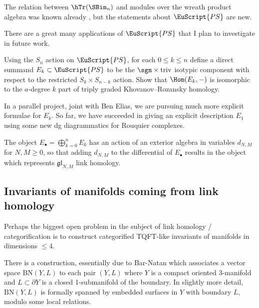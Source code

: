 \documentclass[11pt]{amsart}
\newcommand{\triv}{\mathrm{triv}}
\newcommand{\ZU}{\EuScript{PS}}
\newcommand{\gl}{\mathfrak{gl}}
\begin{document}
\begin{remark}
The relation between $\hTr(\SBim_n)$ and modules over the wreath product algebra was known already \cite{HoLiformality,HRWtrace}, but the statements about $\ZU$ are new.
\end{remark}

There are a great many applications of $\ZU$ that I plan to investigate in future work.

\begin{problem}
Using the $S_n$ action on $\ZU$, for each $0\leq k\leq n$ define a direct summand $E_k\subset \ZU$ to be the $\sgn\times \triv$ isotypic component with respect to the restricted $S_k\times S_{n-k}$ action.  Show that $\Hom(E_k,-)$ is isomorphic to the $a$-degree $k$ part of triply graded Khovanov--Rozansky homology.
\end{problem}

\begin{remark}
In a parallel project, joint with Ben Elias, we are pursuing much more explicit formulae for $E_{k}$.  So far, we have succeeded in giving an explicit description $E_{1}$ using some new dg diagrammatics for Rouquier complexes.
\end{remark}

\begin{conjecture}
The object $E_\bullet=\bigoplus_{k=0}^n E_k$ has an action of an exterior algebra in variables $d_{N,M}$ for $N,M\geq 0$, so that adding $d_{N,M}$ to the differential of  $E_\bullet$ results in the object which represents $\gl_{N,M}$ link homology.
\end{conjecture}
\subsection{Invariants of manifolds coming from link homology}
\label{s:cat TV}

\newcommand{\BNs}{\mathrm{BN}}
\renewcommand{\BN}{\EuScript{BN}}


Perhaps the biggest open problem in the subject of link homology / categorification is to construct categorified TQFT-like invariants of manifolds in dimensions $\leq 4$.

There is a construction, essentially due to Bar-Natan which associates a vector space $\BNs(Y,L)$ to each pair $(Y,L)$ where $Y$ is a compact oriented 3-manifold and $L\subset \partial Y$ is a closed 1-submanifold of the boundary. In slightly more detail, $\BNs(Y,L)$ is formally spanned by embedded surfaces in $Y$ with boundary $L$, modulo some local relations.
\end{document}
